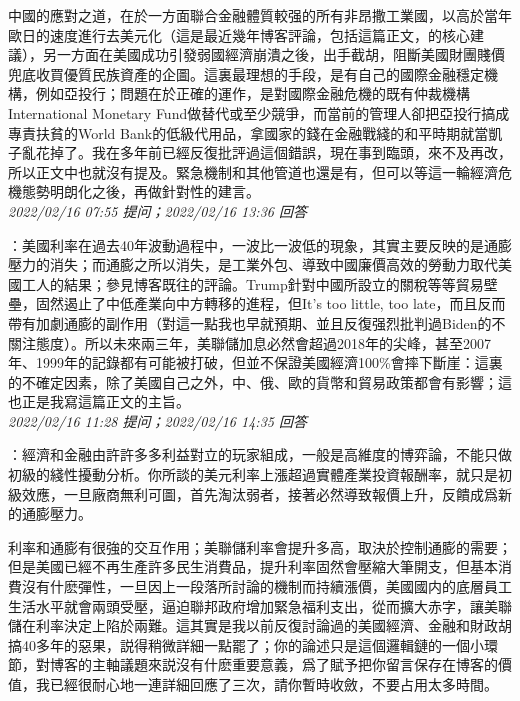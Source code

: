 \documentclass[twocolumn]{ctexart}
\begin{document}
中國的應對之道，在於一方面聯合金融體質較强的所有非昂撒工業國，以高於當年歐日的速度進行去美元化（這是最近幾年博客評論，包括這篇正文，的核心建議），另一方面在美國成功引發弱國經濟崩潰之後，出手截胡，阻斷美國財團賤價兜底收買優質民族資產的企圖。這裏最理想的手段，是有自己的國際金融穩定機構，例如亞投行；問題在於正確的運作，是對國際金融危機的既有仲裁機構International Monetary Fund做替代或至少競爭，而當前的管理人卻把亞投行搞成專責扶貧的World Bank的低級代用品，拿國家的錢在金融戰綫的和平時期就當凱子亂花掉了。我在多年前已經反復批評過這個錯誤，現在事到臨頭，來不及再改，所以正文中也就沒有提及。緊急機制和其他管道也還是有，但可以等這一輪經濟危機態勢明朗化之後，再做針對性的建言。
\\

\textit{\hfill\noindent\small 2022/02/16 07:55 提问；2022/02/16 13:36 回答}

：美國利率在過去40年波動過程中，一波比一波低的現象，其實主要反映的是通膨壓力的消失；而通膨之所以消失，是工業外包、導致中國廉價高效的勞動力取代美國工人的結果；參見博客既往的評論。Trump針對中國所設立的關稅等等貿易壁壘，固然遏止了中低產業向中方轉移的進程，但It's too little, too late，而且反而帶有加劇通膨的副作用（對這一點我也早就預期、並且反復强烈批判過Biden的不關注態度）。所以未來兩三年，美聯儲加息必然會超過2018年的尖峰，甚至2007年、1999年的記錄都有可能被打破，但並不保證美國經濟100\%會摔下斷崖：這裏的不確定因素，除了美國自己之外，中、俄、歐的貨幣和貿易政策都會有影響；這也正是我寫這篇正文的主旨。
\\

\textit{\hfill\noindent\small 2022/02/16 11:28 提问；2022/02/16 14:35 回答}

：經濟和金融由許許多多利益對立的玩家組成，一般是高維度的博弈論，不能只做初級的綫性擾動分析。你所談的美元利率上漲超過實體產業投資報酬率，就只是初級效應，一旦廠商無利可圖，首先淘汰弱者，接著必然導致報價上升，反饋成爲新的通膨壓力。

利率和通膨有很強的交互作用；美聯儲利率會提升多高，取決於控制通膨的需要；但是美國已經不再生產許多民生消費品，提升利率固然會壓縮大筆開支，但基本消費沒有什麽彈性，一旦因上一段落所討論的機制而持續漲價，美國國内的底層員工生活水平就會兩頭受壓，逼迫聯邦政府增加緊急福利支出，從而擴大赤字，讓美聯儲在利率決定上陷於兩難。這其實是我以前反復討論過的美國經濟、金融和財政胡搞40多年的惡果，説得稍微詳細一點罷了；你的論述只是這個邏輯鏈的一個小環節，對博客的主軸議題來説沒有什麽重要意義，爲了賦予把你留言保存在博客的價值，我已經很耐心地一連詳細回應了三次，請你暫時收斂，不要占用太多時間。
\end{document}
